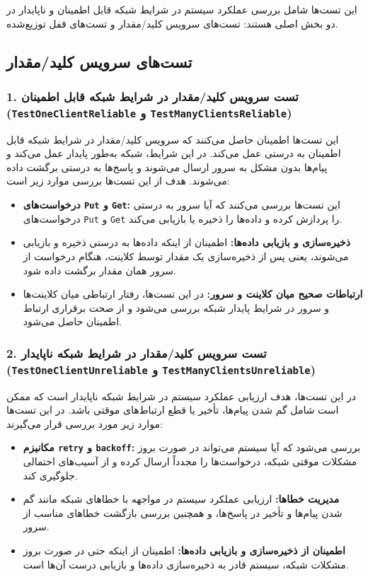  این تست‌ها شامل بررسی عملکرد سیستم در شرایط شبکه قابل اطمینان و ناپایدار در دو بخش اصلی هستند: تست‌های سرویس کلید/مقدار و تست‌های قفل توزیع‌شده.

\subsection*{تست‌های سرویس کلید/مقدار}

\subsubsection*{1. تست سرویس کلید/مقدار در شرایط شبکه قابل اطمینان (\texttt{TestOneClientReliable} و \texttt{TestManyClientsReliable})}

این تست‌ها اطمینان حاصل می‌کنند که سرویس کلید/مقدار در شرایط شبکه قابل اطمینان به درستی عمل می‌کند. در این شرایط، شبکه به‌طور پایدار عمل می‌کند و پیام‌ها بدون مشکل به سرور ارسال می‌شوند و پاسخ‌ها به درستی برگشت داده می‌شوند. هدف از این تست‌ها بررسی موارد زیر است:
\begin{itemize}
    \item \textbf{درخواست‌های \texttt{Put} و \texttt{Get}:} این تست‌ها بررسی می‌کنند که آیا سرور به درستی درخواست‌های \texttt{Put} و \texttt{Get} را پردازش کرده و داده‌ها را ذخیره یا بازیابی می‌کند.
    \item \textbf{ذخیره‌سازی و بازیابی داده‌ها:} اطمینان از اینکه داده‌ها به درستی ذخیره و بازیابی می‌شوند، یعنی پس از ذخیره‌سازی یک مقدار توسط کلاینت، هنگام درخواست از سرور همان مقدار برگشت داده شود.
    \item \textbf{ارتباطات صحیح میان کلاینت و سرور:} در این تست‌ها، رفتار ارتباطی میان کلاینت‌ها و سرور در شرایط پایدار شبکه بررسی می‌شود و از صحت برقراری ارتباط اطمینان حاصل می‌شود.
\end{itemize}

\subsubsection*{2. تست سرویس کلید/مقدار در شرایط شبکه ناپایدار (\texttt{TestOneClientUnreliable} و \texttt{TestManyClientsUnreliable})}

در این تست‌ها، هدف ارزیابی عملکرد سیستم در شرایط شبکه ناپایدار است که ممکن است شامل گم شدن پیام‌ها، تأخیر یا قطع ارتباط‌های موقتی باشد. در این تست‌ها موارد زیر مورد بررسی قرار می‌گیرند:
\begin{itemize}
    \item \textbf{مکانیزم \texttt{retry} و \texttt{backoff}:} بررسی می‌شود که آیا سیستم می‌تواند در صورت بروز مشکلات موقتی شبکه، درخواست‌ها را مجدداً ارسال کرده و از آسیب‌های احتمالی جلوگیری کند.
    \item \textbf{مدیریت خطاها:} ارزیابی عملکرد سیستم در مواجهه با خطاهای شبکه مانند گم شدن پیام‌ها و تأخیر در پاسخ‌ها، و همچنین بررسی بازگشت خطاهای مناسب از سرور.
    \item \textbf{اطمینان از ذخیره‌سازی و بازیابی داده‌ها:} اطمینان از اینکه حتی در صورت بروز مشکلات شبکه، سیستم قادر به ذخیره‌سازی داده‌ها و بازیابی درست آن‌ها است.
\end{itemize}

